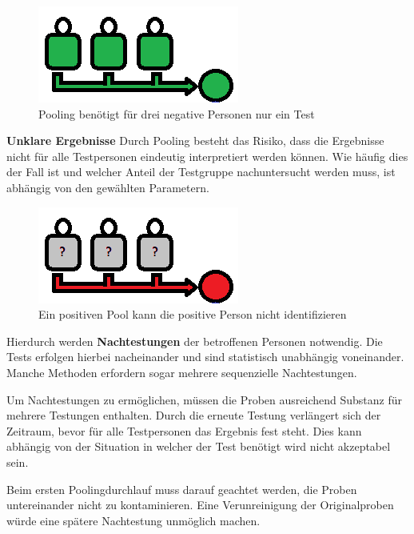\begin{figure}[h]
	\centering
	\includegraphics[width=.5\textwidth]{img/PoolAlleNegativ}
	\caption{Pooling benötigt für drei negative Personen nur ein Test\footnotemark}
\end{figure}




\textbf{Unklare Ergebnisse}\newline
Durch Pooling besteht das Risiko, dass die Ergebnisse nicht für alle Testpersonen eindeutig interpretiert werden können.
Wie häufig dies der Fall ist und welcher Anteil der Testgruppe nachuntersucht werden muss, ist abhängig von den gewählten Parametern.

\begin{figure}[h]
	\centering
	\includegraphics[width=.5\textwidth]{img/PoolPositiv}
	\caption{Ein positiven Pool kann die positive Person nicht identifizieren\footnotemark}
\end{figure}

Hierdurch werden \textbf{Nachtestungen} der betroffenen Personen notwendig.
Die Tests erfolgen hierbei nacheinander und sind statistisch unabhängig voneinander.
Manche Methoden erfordern sogar mehrere sequenzielle Nachtestungen.

Um Nachtestungen zu ermöglichen, müssen die Proben ausreichend Substanz für mehrere Testungen enthalten.
Durch die erneute Testung verlängert sich der Zeitraum, bevor für alle Testpersonen das Ergebnis fest steht.
Dies kann abhängig von der Situation in welcher der Test benötigt wird nicht akzeptabel sein.

Beim ersten Poolingdurchlauf muss darauf geachtet werden, die Proben untereinander nicht zu kontaminieren.
Eine Verunreinigung der Originalproben würde eine spätere Nachtestung unmöglich machen.

